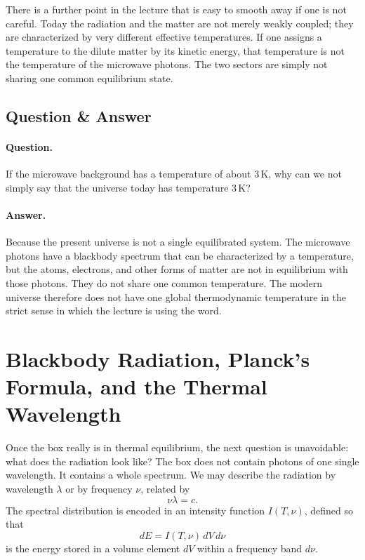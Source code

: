 There is a further point in the lecture that is easy to smooth away if one is not careful. Today the radiation and the matter are not merely weakly coupled; they are characterized by very different effective temperatures. If one assigns a temperature to the dilute matter by its kinetic energy, that temperature is not the temperature of the microwave photons. The two sectors are simply not sharing one common equilibrium state.

\subsection{Question \& Answer}

\paragraph{Question.} If the microwave background has a temperature of about \(3\,\mathrm{K}\), why can we not simply say that the universe today has temperature \(3\,\mathrm{K}\)?

\paragraph{Answer.} Because the present universe is not a single equilibrated system. The microwave photons have a blackbody spectrum that can be characterized by a temperature, but the atoms, electrons, and other forms of matter are not in equilibrium with those photons. They do not share one common temperature. The modern universe therefore does not have one global thermodynamic temperature in the strict sense in which the lecture is using the word.

\section{Blackbody Radiation, Planck's Formula, and the Thermal Wavelength}

Once the box really is in thermal equilibrium, the next question is unavoidable: what does the radiation look like? The box does not contain photons of one single wavelength. It contains a whole spectrum. We may describe the radiation by wavelength \(\lambda\) or by frequency \(\nu\), related by
\begin{equation}
\nu \lambda = c.
\end{equation}
The spectral distribution is encoded in an intensity function \(I(T,\nu)\), defined so that
\begin{equation}
dE = I(T,\nu)\, dV\, d\nu
\end{equation}
is the energy stored in a volume element \(dV\) within a frequency band \(d\nu\).

